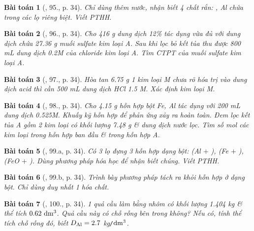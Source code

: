 \documentclass{article}
\newtheorem{baitoan}{Bài toán}
\begin{document}
\begin{baitoan}[\cite{An_400_BT_Hoa_Hoc_9}, 95., p. 34]
	Chỉ dùng thêm nước, nhận biết 4 chất rắn: {\rm{}, Al} chứa trong các lọ riêng biệt. Viết {\rm PTHH}.
\end{baitoan}

\begin{baitoan}[\cite{An_400_BT_Hoa_Hoc_9}, 96., p. 34]
	Cho {\rm416 g} dung dịch {\rm{} 12\%} tác dụng vừa đủ với dung dịch chứa {\rm27.36 g} muối sulfate kim loại A. Sau khi lọc bỏ kết tủa thu được {\rm800 mL} dung dịch {\rm0.2M} của chloride kim loại A. Tìm {\rm CTPT} của muối sulfate kim loại A.
\end{baitoan}

\begin{baitoan}[\cite{An_400_BT_Hoa_Hoc_9}, 97., p. 34]
	Hòa tan {\rm6.75 g} 1 kim loại M chưa rõ hóa trị vào dung dịch acid thì cần {\rm500 mL} dung dịch {\rm HCl 1.5 M}. Xác định kim loại M.
\end{baitoan}

\begin{baitoan}[\cite{An_400_BT_Hoa_Hoc_9}, 98., p. 34]
	Cho {\rm4.15 g} hỗn hợp bột {\rm Fe, Al} tác dụng với {\rm200 mL} dung dịch {\rm{} 0.525M}. Khuấy kỹ hỗn hợp để phản ứng xảy ra hoàn toàn. Đem lọc kết tủa A gồm 2 kim loại có khối lượng {\rm7.48 g} \& dung dịch nước lọc. Tìm số mol các kim loại trong hỗn hợp ban đầu \& trong hỗn hợp A.
\end{baitoan}

\begin{baitoan}[\cite{An_400_BT_Hoa_Hoc_9}, 99.a, p. 34]
	Có 3 lọ đựng 3 hỗn hợp dạng bột: {\rm(Al $+$ ), (Fe $+$ ), (FeO $+$ )}. Dùng phương pháp hóa học để nhận biết chúng. Viết {\rm PTHH}.
\end{baitoan}

\begin{baitoan}[\cite{An_400_BT_Hoa_Hoc_9}, 99.b, p. 34]
	Trình bày phương pháp tách {\rm{}} ra khỏi hỗn hợp {\rm{}} ở dạng bột. Chỉ dùng duy nhất 1 hóa chất.
\end{baitoan}

\begin{baitoan}[\cite{An_400_BT_Hoa_Hoc_9}, 100., p. 34]
	1 quả cầu làm bằng nhôm có khối lượng {\rm1.404 kg} \& thể tích $\rm0.62\ dm^3$. Quả cầu này có chỗ rỗng bên trong không? Nếu có, tính thể tích chỗ rỗng đó, biết $D_{\rm Al} = 2.7$ {\rm kg{\tt/}$\rm dm^3$}.
\end{baitoan}


\printbibliography[heading=bibintoc]
\end{document}
